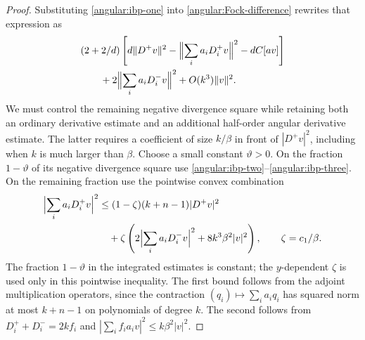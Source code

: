 \begin{proof}
Substituting \eqref{angular:ibp-one} into
\eqref{angular:Fock-difference} rewrites that expression as
\begin{equation}\label{angular:after-first-ibp}
 \begin{split}
 &(2+2/d)\left[d\|D^+v\|^2
       -\Bigl\|\sum_i a_iD_i^+v\Bigr\|^2-dC[av]\right]\\
 &\qquad+2\Bigl\|\sum_i a_iD_i^-v\Bigr\|^2
                      +O(k^3)\|v\|^2.
 \end{split}
\end{equation}
We must control the remaining negative divergence square while retaining
both an ordinary derivative estimate and an additional half-order
angular derivative estimate.  The latter requires a coefficient of
size $k/\beta$ in front of $|D^+v|^2$, including when $k$ is much larger
than $\beta$.  Choose a small constant $\vartheta>0$.
On the fraction $1-\vartheta$ of its negative divergence square use
\eqref{angular:ibp-two}--\eqref{angular:ibp-three}.  On the remaining
fraction use the pointwise convex combination
\begin{equation}\label{angular:convex-bound}
 \begin{split}
 \Bigl|\sum_i a_iD_i^+v\Bigr|^2
 &\le(1-\zeta)(k+n-1)|D^+v|^2\\
 &\quad+\zeta\left(2\Bigl|\sum_i a_iD_i^-v\Bigr|^2
                         +8k^3\beta^2|v|^2\right),
 \qquad \zeta=c_1/\beta.
 \end{split}
\end{equation}
The fraction $1-\vartheta$ in the integrated estimates is constant;
the $y$-dependent $\zeta$ is used only in this pointwise inequality.
The first bound follows from the adjoint multiplication operators, since
the contraction $(q_i)\mapsto\sum_i a_iq_i$ has squared norm at most
$k+n-1$ on polynomials of degree $k$.  The second follows from
$D_i^++D_i^-=2k f_i$ and
$|\sum_i f_i a_i v|^2\le k\beta^2|v|^2$.


\end{proof}
